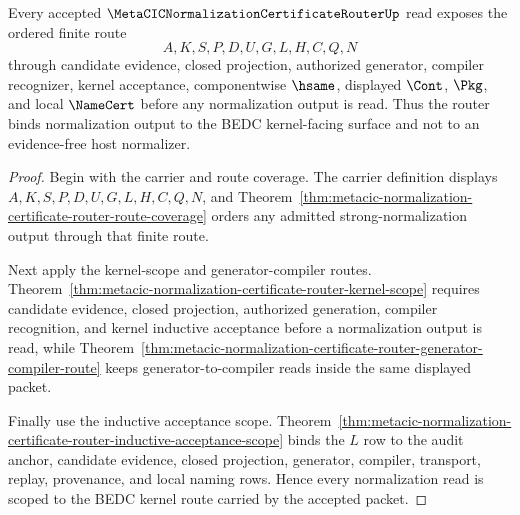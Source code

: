 \begin{theorem}
\label{thm:metacic-normalization-certificate-router-scoped-kernel-route}
Every accepted $\MetaCICNormalizationCertificateRouterUp$ read exposes the ordered finite route
$$
A,K,S,P,D,U,G,L,H,C,Q,N
$$
through candidate evidence, closed projection, authorized generator, compiler recognizer, kernel acceptance, componentwise $\hsame$, displayed $\Cont$, $\Pkg$, and local $\NameCert$ before any normalization output is read. Thus the router binds normalization output to the BEDC kernel-facing surface and not to an evidence-free host normalizer.
\end{theorem}
\begin{proof}
Begin with the carrier and route coverage. The carrier definition displays $A,K,S,P,D,U,G,L,H,C,Q,N$, and Theorem~\ref{thm:metacic-normalization-certificate-router-route-coverage} orders any admitted strong-normalization output through that finite route.

Next apply the kernel-scope and generator-compiler routes. Theorem~\ref{thm:metacic-normalization-certificate-router-kernel-scope} requires candidate evidence, closed projection, authorized generation, compiler recognition, and kernel inductive acceptance before a normalization output is read, while Theorem~\ref{thm:metacic-normalization-certificate-router-generator-compiler-route} keeps generator-to-compiler reads inside the same displayed packet.

Finally use the inductive acceptance scope. Theorem~\ref{thm:metacic-normalization-certificate-router-inductive-acceptance-scope} binds the $L$ row to the audit anchor, candidate evidence, closed projection, generator, compiler, transport, replay, provenance, and local naming rows. Hence every normalization read is scoped to the BEDC kernel route carried by the accepted packet.
\end{proof}

